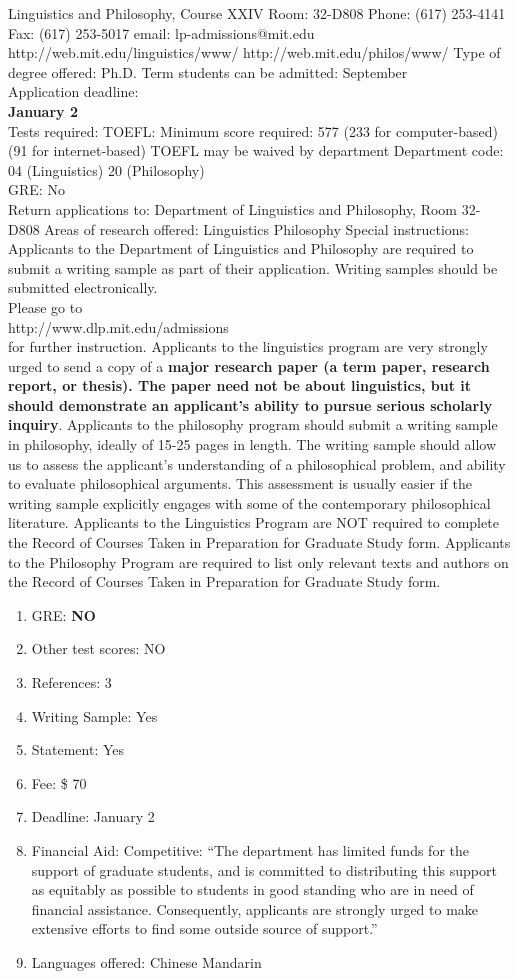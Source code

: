 \documentclass[11pt]{article}
\begin{document}
Linguistics and Philosophy, Course XXIV Room: 32-D808 Phone: (617) 253-4141 Fax: (617) 253-5017 email: lp-admissions@mit.edu http://web.mit.edu/linguistics/www/ http://web.mit.edu/philos/www/ Type of degree offered: Ph.D. Term students can be admitted: September\\ Application deadline:\\
{\bf January 2}\\ Tests required: TOEFL: Minimum score required: 577 (233 for computer-based) (91 for internet-based) TOEFL may be waived by department Department code: 04 (Linguistics) 20 (Philosophy)\\ GRE: No\\ Return applications to: Department of Linguistics and Philosophy, Room 32-D808 Areas of research offered: Linguistics Philosophy Special instructions:
Applicants to the Department of Linguistics and Philosophy are required to submit a writing sample as part of their application. Writing samples should be
submitted electronically.\\ Please go to \\http://www.dlp.mit.edu/admissions\\ for further instruction. Applicants to the linguistics program are very strongly urged to send a copy of a {\bf major research paper (a term paper, research report, or thesis). The paper need not be about linguistics, but it should demonstrate an applicant's ability to pursue serious scholarly inquiry}.
Applicants to the philosophy program should submit a writing sample in philosophy, ideally of 15-25 pages in length. The writing sample should allow us to assess the applicant's understanding of a philosophical problem, and ability to evaluate philosophical arguments. This assessment is usually easier if the writing sample explicitly engages with some of the contemporary philosophical literature. Applicants to the Linguistics Program are NOT required to complete the Record of Courses Taken in Preparation for Graduate Study form. Applicants to the Philosophy Program are required to list only relevant texts and authors on the Record of Courses Taken in Preparation for Graduate Study form.\\

\begin{enumerate}
\item GRE: {\bf NO}
\item Other test scores: NO
\item References: 3
\item Writing Sample: Yes
\item Statement: Yes
\item Fee: \$ 70
\item Deadline: January 2
\item Financial Aid: Competitive: ``The department has limited funds for the support of graduate students, and is committed to distributing this support as equitably as possible to students in good standing who are in need of financial assistance. Consequently, applicants are strongly urged to make extensive efforts to find some outside source of support.''
\item Languages offered: Chinese Mandarin
\end{enumerate}
\end{document}
